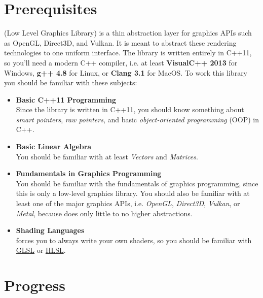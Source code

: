 \documentclass{article}
\begin{document}
\section{Prerequisites}

\LLGL (Low Level Graphics Library) is a thin abstraction layer for graphics APIs such as
OpenGL, Direct3D, and Vulkan. It is meant to abstract these rendering technologies to one uniform interface.
The library is written entirely in C++11, so you'll
need a modern C++ compiler, i.e. at least \textbf{VisualC++ 2013} for Windows,
\textbf{g++ 4.8} for Linux, or \textbf{Clang 3.1} for MacOS.
To work this library you should be familiar with these subjects:
\begin{itemize}
	\item \textbf{Basic C++11 Programming} \\
	Since the library is written in C++11, you should know something about \emph{smart pointers},
	\emph{raw pointers}, and basic \emph{object-oriented programming} (OOP) in C++.
	
	\item \textbf{Basic Linear Algebra} \\
	You should be familiar with at least \emph{Vectors} and \emph{Matrices}.
	
	\item \textbf{Fundamentals in Graphics Programming} \\
	You should be familiar with the fundamentals of graphics programming, since this is only a low-level graphics library.
	You should also be familiar with at least one of the major graphics APIs,
	i.e. \emph{OpenGL}, \emph{Direct3D}, \emph{Vulkan}, or \emph{Metal},
	because \LLGL does only little to no higher abstractions.
	
	\item \textbf{Shading Languages} \\
	\LLGL forces you to always write your own shaders, so you should be familiar with
	\href{https://www.opengl.org/documentation/glsl/}{GLSL} or
	\href{https://msdn.microsoft.com/de-de/library/windows/desktop/bb509561(v=vs.85).aspx}{HLSL}.
\end{itemize}



\newpage
\section{Progress}
\end{document}
